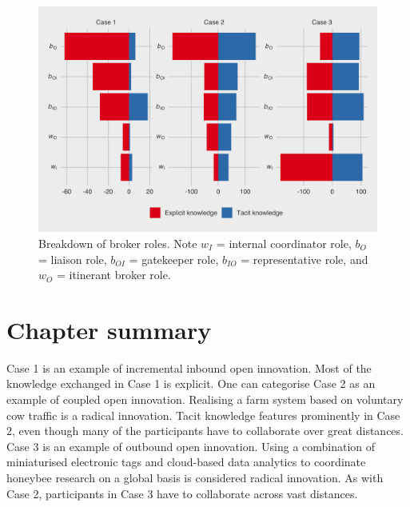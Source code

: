 \begin{figure}
\centering
\includegraphics[width = \linewidth]{Images/gf_brokerage.png}
\caption[Breakdown of broker roles]{Breakdown of \citet{gould1989structures} broker roles. Note $w_I$ = internal coordinator role, $b_O$ = liaison role, $b_{OI}$ = gatekeeper role, $b_{IO}$ = representative role, and $w_O$ = itinerant broker role.}
\label{fig:gf_brokerage}
\end{figure}

\section{Chapter summary}

Case 1 is an example of incremental inbound open innovation. Most of the knowledge exchanged in Case 1 is explicit. One can categorise Case 2 as an example of coupled open innovation. Realising a farm system based on voluntary cow traffic is a radical innovation. Tacit knowledge features prominently in Case 2, even though many of the participants have to collaborate over great distances. Case 3 is an example of outbound open innovation. Using a combination of miniaturised electronic tags and cloud-based data analytics to coordinate honeybee research on a global basis is considered radical innovation. As with Case 2, participants in Case 3 have to collaborate across vast distances. \medskip


